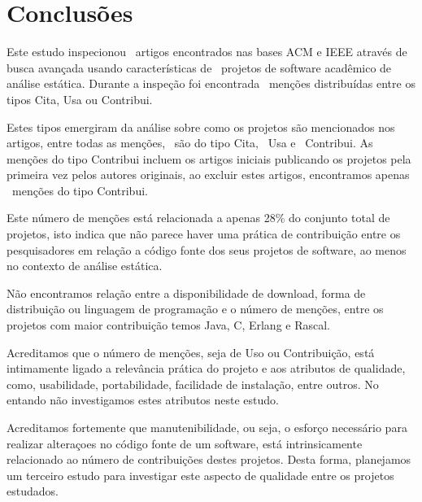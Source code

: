 
\section{Conclusões} \label{estudo2:conclusoes} %

Este estudo inspecionou \SearchUniqueCount \ artigos encontrados nas bases ACM
e IEEE através de busca avançada usando características de \SoftwareCount \
projetos de software acadêmico de análise estática. Durante a inspeção foi
encontrada \ScreeningCount \ menções distribuídas entre os tipos Cita, Usa ou
Contribui.

Estes tipos emergiram da análise sobre como os projetos são mencionados nos
artigos, entre todas as menções, \CiteCount \ são do tipo Cita, \UseCount \ Usa
e \ContributeCount \ Contribui. As menções do tipo Contribui incluem os artigos
iniciais publicando os projetos pela primeira vez pelos autores originais,
ao excluir estes artigos, encontramos apenas \ContributeStudyDoisCount \ menções
do tipo Contribui.

Este número de menções está relacionada a apenas 28\% do conjunto total de
projetos, isto indica que não parece haver uma prática de contribuição entre os
pesquisadores em relação a código fonte dos seus projetos de software, ao menos
no contexto de análise estática.


Não encontramos relação entre a disponibilidade de download, forma de
distribuição ou linguagem de programação e o número de menções, entre os
projetos com maior contribuição temos Java, C, Erlang e Rascal.

Acreditamos que o número de menções, seja de Uso ou Contribuição, está
intimamente ligado a relevância prática do projeto e aos atributos de
qualidade, como, usabilidade, portabilidade, facilidade de instalação, entre
outros. No entando não investigamos estes atributos neste estudo.

Acreditamos fortemente que manutenibilidade, ou seja, o esforço necessário para
realizar alteraçoes no código fonte de um software, está intrinsicamente
relacionado ao número de contribuições destes projetos. Desta forma, planejamos
um terceiro estudo para investigar este aspecto de qualidade entre os projetos
estudados.

